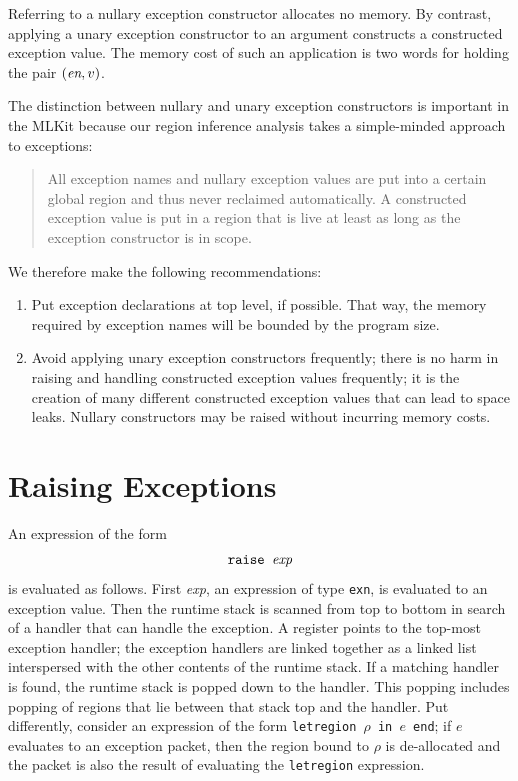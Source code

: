 \documentclass[12pt]{book}
\begin{document}
Referring to a nullary exception constructor allocates no memory. By
contrast, applying a unary exception constructor to an argument
constructs a constructed exception value. The memory cost of such an
application is two words for holding the pair $(\hbox{\it en}, v)$.

The distinction between nullary and unary exception constructors is
important in the MLKit because our region inference analysis takes a
simple-minded approach to exceptions:
\begin{quote}
  All exception names and nullary exception values are put into a
  certain
  global region and thus never reclaimed automatically. A constructed
  exception value is put in a region that is live at least as long as
  the exception constructor is in scope.
\end{quote}
We therefore make the following recommendations:
\begin{enumerate}
\item Put exception declarations at top level, if possible.  That way,
  the memory required by exception names will be bounded by the
  program size.
\item Avoid applying unary exception constructors frequently; there is
  no harm in raising and handling constructed exception values
  frequently; it is the creation of many different constructed
  exception values that can lead to space leaks. Nullary constructors
  may be raised without incurring memory costs.
\end{enumerate}

\section{Raising Exceptions}
An expression of the form 
%
$$\hbox{\tt raise {\it exp}}$$
is evaluated as follows. First {\it exp},
an expression of type {\tt exn}, is evaluated to an exception value.
Then the runtime
%
stack is scanned from top to bottom in search of a handler that
can handle the exception. A register points to the top-most exception
handler; the exception handlers are linked together as a linked list
interspersed with the other contents of the runtime stack.  If a
matching handler is found, the runtime stack is popped down to the
handler. This popping includes popping of regions that lie between
that stack top and the handler. Put differently, consider an
expression of the form
%
{\tt letregion $\rho$ in $e$ end}; if $e$ evaluates to an exception
packet, then the region bound to $\rho$ is de-allocated and the packet
is also the result of evaluating the \texttt{letregion} expression.
\end{document}
